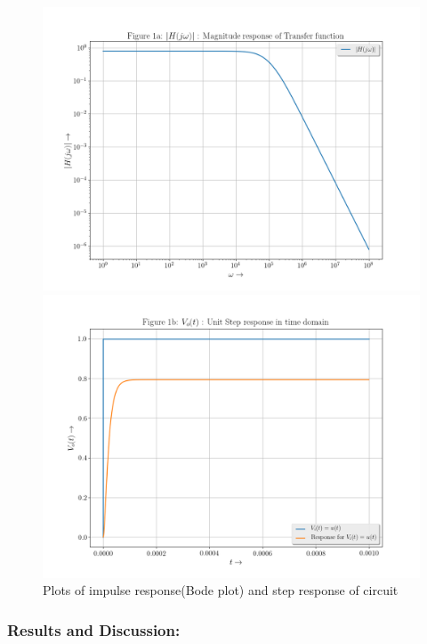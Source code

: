 \documentclass[11pt, a4paper]{article}
\begin{document}
\newpage
\begin{figure}[!tbh]
    \centering
    \includegraphics[scale=0.4]{./../Extras/A71a.png}  %
    
    \includegraphics[scale=0.4]{./../Extras/A71b.png}  %
    \caption{Plots of impulse response(Bode plot) and step response of circuit}
  \end{figure}
\newpage

\subsubsection{Results and Discussion:}\label{results-and-discussion}
\end{document}
